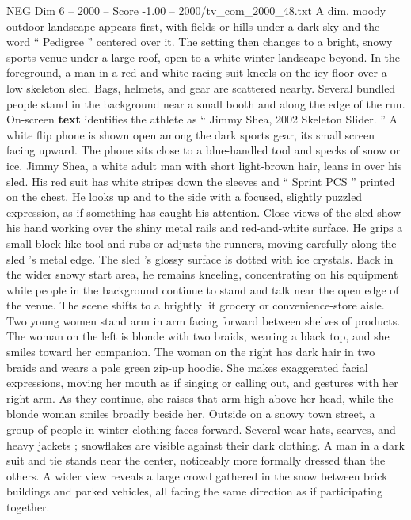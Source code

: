 \begin{textsample}{NEG Dim 6 – 2000 – Score -1.00 – 2000/tv\_com\_2000\_48.txt}  \label{ex:f6_neg_050}
A dim, moody outdoor landscape appears first, with fields or hills under a dark sky and the word “ Pedigree ” centered over it.
The setting then changes to a bright, snowy sports venue under a large roof, open to a white winter landscape beyond.
In the foreground, a man in a red-and-white racing suit kneels on the icy floor over a low skeleton sled.
Bags, helmets, and gear are scattered nearby.
Several bundled people stand in the background near a small booth and along the edge of the run.
On-screen \textbf{text} identifies the athlete as “ Jimmy Shea, 2002 Skeleton Slider. ” A white flip phone is shown open among the dark sports gear, its small screen facing upward.
The phone sits close to a blue-handled tool and specks of snow or ice.
Jimmy Shea, a white adult man with short light-brown hair, leans in over his sled.
His red suit has white stripes down the sleeves and “ Sprint PCS ” printed on the chest.
He looks up and to the side with a focused, slightly puzzled expression, as if something has caught his attention.
Close views of the sled show his hand working over the shiny metal rails and red-and-white surface.
He grips a small block-like tool and rubs or adjusts the runners, moving carefully along the sled ’s metal edge.
The sled ’s glossy surface is dotted with ice crystals.
Back in the wider snowy start area, he remains kneeling, concentrating on his equipment while people in the background continue to stand and talk near the open edge of the venue.
The scene shifts to a brightly lit grocery or convenience-store aisle.
Two young women stand arm in arm facing forward between shelves of products.
The woman on the left is blonde with two braids, wearing a black top, and she smiles toward her companion.
The woman on the right has dark hair in two braids and wears a pale green zip-up hoodie.
She makes exaggerated facial expressions, moving her mouth as if singing or calling out, and gestures with her right arm.
As they continue, she raises that arm high above her head, while the blonde woman smiles broadly beside her.
Outside on a snowy town street, a group of people in winter clothing faces forward.
Several wear hats, scarves, and heavy jackets ; snowflakes are visible against their dark clothing.
A man in a dark suit and tie stands near the center, noticeably more formally dressed than the others.
A wider view reveals a large crowd gathered in the snow between brick buildings and parked vehicles, all facing the same direction as if participating together.

\end{textsample}
